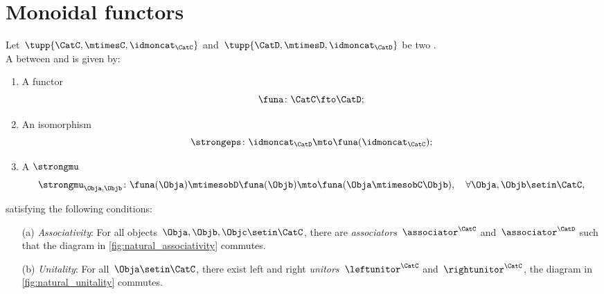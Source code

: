 
\section{Monoidal functors}
\label{sec:monoidal-functors}
\begin{ctdefinition}
    \label{def:strong-monoidal-functor}
    Let~$\tupp{\CatC,\mtimesC,\idmoncat_{\CatC}}$ and~$\tupp{\CatD,{{\mtimesD}},\idmoncat_{\CatD}}$ be two .
    \\
    A  between \CatC and \CatD is given by:
    \begin{enumerate}
        \item A functor
              \begin{equation}
                  \funa \colon \CatC \fto \CatD;
              \end{equation}
        \item An isomorphism \label{def:strongeps}
              \begin{equation}
                  \strongeps\colon \idmoncat_{\CatD}\mto \funa(\idmoncat_{\CatC});
              \end{equation}
        \item A  $\strongmu$ \label{def:strongmu}
              \begin{equation}
                  \strongmu_{\Obja,\Objb}\colon \funa(\Obja)\mtimesobD \funa(\Objb) \mto \funa(\Obja \mtimesobC \Objb),\quad \forall \Obja,\Objb\setin \CatC,
              \end{equation}
    \end{enumerate}
    satisfying the following conditions:
    \begin{enumerate}
        \item[(a)] \emph{Associativity}: For all objects~$\Obja,\Objb,\Objc\setin \CatC$, there are  \emph{associators}~$\associator^\CatC$ and~$\associator^\CatD$ such that the diagram in \cref{fig:natural_associativity} commutes.
        \item[(b)] \emph{Unitality}: For all~$\Obja\setin \CatC$, there exist left and right \emph{unitors}~$\leftunitor^\CatC$ and~$\rightunitor^\CatC$, the diagram in
            \cref{fig:natural_unitality} commutes.
    \end{enumerate}
\end{ctdefinition}
